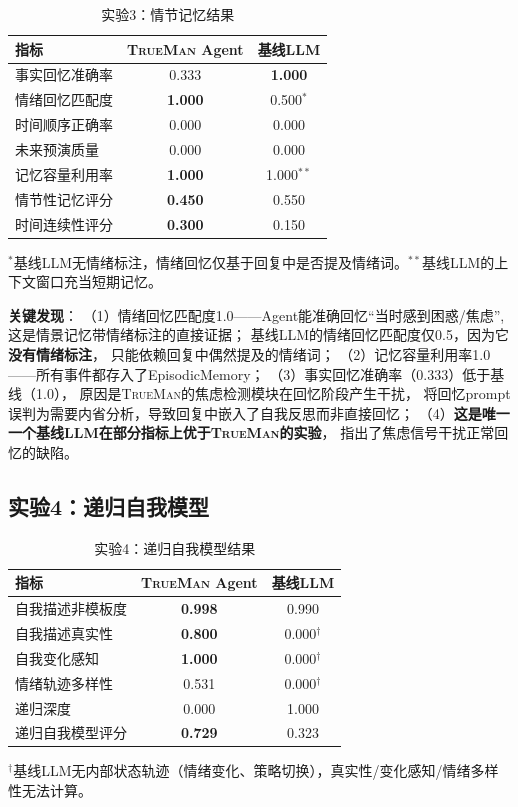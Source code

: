 \documentclass[11pt,a4paper]{article}
\newcommand{\TrueMan}{\textsc{TrueMan}}
\begin{document}
\begin{table}[htbp]
\centering
\caption{实验3：情节记忆结果}
\label{tab:exp3_results}
\begin{tabular}{lcc}
\toprule
指标 & \TrueMan{} Agent & 基线LLM \\
\midrule
事实回忆准确率 & 0.333 & \textbf{1.000} \\
情绪回忆匹配度 & \textbf{1.000} & 0.500$^*$ \\
时间顺序正确率 & 0.000 & 0.000 \\
未来预演质量 & 0.000 & 0.000 \\
记忆容量利用率 & \textbf{1.000} & 1.000$^{**}$ \\
\midrule
情节性记忆评分 & \textbf{0.450} & 0.550 \\
时间连续性评分 & \textbf{0.300} & 0.150 \\
\bottomrule
\end{tabular}
\begin{flushleft}
\scriptsize $^*$基线LLM无情绪标注，情绪回忆仅基于回复中是否提及情绪词。$^{**}$基线LLM的上下文窗口充当短期记忆。
\end{flushleft}
\end{table}

\textbf{关键发现}：
（1）情绪回忆匹配度1.0——Agent能准确回忆``当时感到困惑/焦虑'',
这是情景记忆带情绪标注的直接证据；
基线LLM的情绪回忆匹配度仅0.5，因为它\textbf{没有情绪标注}，
只能依赖回复中偶然提及的情绪词；
（2）记忆容量利用率1.0——所有事件都存入了EpisodicMemory；
（3）事实回忆准确率（0.333）低于基线（1.0），
原因是\TrueMan{}的焦虑检测模块在回忆阶段产生干扰，
将回忆prompt误判为需要内省分析，导致回复中嵌入了自我反思而非直接回忆；
（4）\textbf{这是唯一一个基线LLM在部分指标上优于\TrueMan{}的实验}，
指出了焦虑信号干扰正常回忆的缺陷。

\subsection{实验4：递归自我模型}

\begin{table}[htbp]
\centering
\caption{实验4：递归自我模型结果}
\label{tab:exp4_results}
\begin{tabular}{lcc}
\toprule
指标 & \TrueMan{} Agent & 基线LLM \\
\midrule
自我描述非模板度 & \textbf{0.998} & 0.990 \\
自我描述真实性 & \textbf{0.800} & 0.000$^\dagger$ \\
自我变化感知 & \textbf{1.000} & 0.000$^\dagger$ \\
情绪轨迹多样性 & 0.531 & 0.000$^\dagger$ \\
递归深度 & 0.000 & 1.000 \\
\midrule
递归自我模型评分 & \textbf{0.729} & 0.323 \\
\bottomrule
\end{tabular}
\begin{flushleft}
\scriptsize $^\dagger$基线LLM无内部状态轨迹（情绪变化、策略切换），真实性/变化感知/情绪多样性无法计算。
\end{flushleft}
\end{table}
\end{document}
